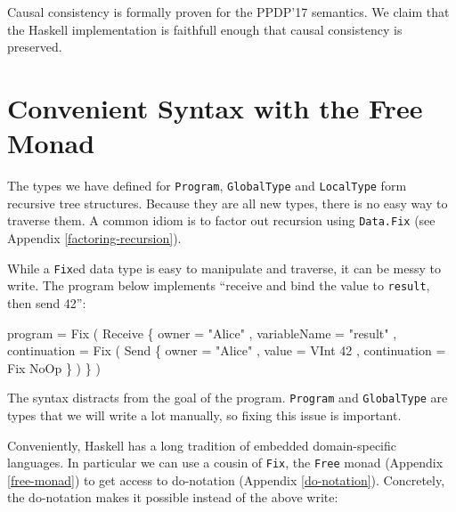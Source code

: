 \documentclass[runningheads,plain]{llncs}
\newenvironment{Shaded}{}{}
\newcommand{\DataTypeTok}[1]{\textcolor[rgb]{0.56,0.13,0.00}{#1}}
\newcommand{\DecValTok}[1]{\textcolor[rgb]{0.25,0.63,0.44}{#1}}
\newcommand{\StringTok}[1]{\textcolor[rgb]{0.25,0.44,0.63}{#1}}
\newcommand{\FunctionTok}[1]{\textcolor[rgb]{0.02,0.16,0.49}{#1}}
\newcommand{\NormalTok}[1]{#1}
\begin{document}
Causal consistency is formally proven for the PPDP'17 semantics. We
claim that the Haskell implementation is faithfull enough that causal
consistency is preserved.

\section{Convenient Syntax with the Free Monad}\label{free-monad-dsl}

The types we have defined for \texttt{Program}, \texttt{GlobalType} and
\texttt{LocalType} form recursive tree structures. Because they are all
new types, there is no easy way to traverse them. A common idiom is to
factor out recursion using \texttt{Data.Fix} (see Appendix
\ref{factoring-recursion}).

While a \texttt{Fix}ed data type is easy to manipulate and traverse, it
can be messy to write. The program below implements ``receive and bind
the value to \texttt{result}, then send 42'':

\begin{Shaded}
\begin{Highlighting}[]
\NormalTok{program }\FunctionTok{=}  
    \DataTypeTok{Fix} 
\NormalTok{        ( }\DataTypeTok{Receive} 
\NormalTok{            \{ owner }\FunctionTok{=} \StringTok{"Alice"}
\NormalTok{            , variableName }\FunctionTok{=} \StringTok{"result"}
\NormalTok{            , continuation }\FunctionTok{=} 
                  \DataTypeTok{Fix} 
\NormalTok{                    ( }\DataTypeTok{Send} 
\NormalTok{                        \{ owner }\FunctionTok{=} \StringTok{"Alice"}
\NormalTok{                        , value }\FunctionTok{=} \DataTypeTok{VInt} \DecValTok{42}
\NormalTok{                        , continuation }\FunctionTok{=} \DataTypeTok{Fix} \DataTypeTok{NoOp} 
\NormalTok{                        \}}
\NormalTok{                    )}
\NormalTok{              \}}
\NormalTok{        )}
\end{Highlighting}
\end{Shaded}

The syntax distracts from the goal of the program. \texttt{Program} and
\texttt{GlobalType} are types that we will write a lot manually, so
fixing this issue is important.

Conveniently, Haskell has a long tradition of embedded domain-specific
languages. In particular we can use a cousin of \texttt{Fix}, the
\texttt{Free} monad (Appendix \ref{free-monad}) to get access to
do-notation (Appendix \ref{do-notation}). Concretely, the do-notation
makes it possible instead of the above write:
\end{document}
